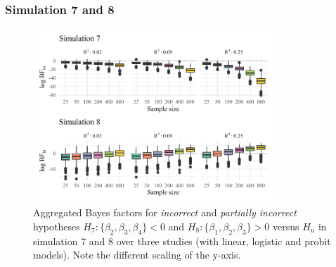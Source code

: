\documentclass[
  authoryear,
  preprint,
  5p,
  twocolumn]{elsarticle}
\begin{document}
\hypertarget{simulation-7-and-8}{%
\subsubsection{Simulation 7 and 8}\label{simulation-7-and-8}}

\begin{figure}

{\centering \includegraphics[width=0.81\textwidth,height=\textheight]{manuscript_volker_files/figure-pdf/fig-sim78-1.pdf}

}

\caption{\label{fig-sim78-1}Aggregated Bayes factors for
\textit{incorrect} and \textit{partially incorrect} hypotheses
\(H_7: \{\beta_2, \beta_3, \beta_4\} < 0\) and
\(H_8: \{\beta_1, \beta_2, \beta_3\} > 0\) versus \(H_u\) in simulation
7 and 8 over three studies (with linear, logistic and probit models).
Note the different scaling of the y-axis.}

\end{figure}
\end{document}

